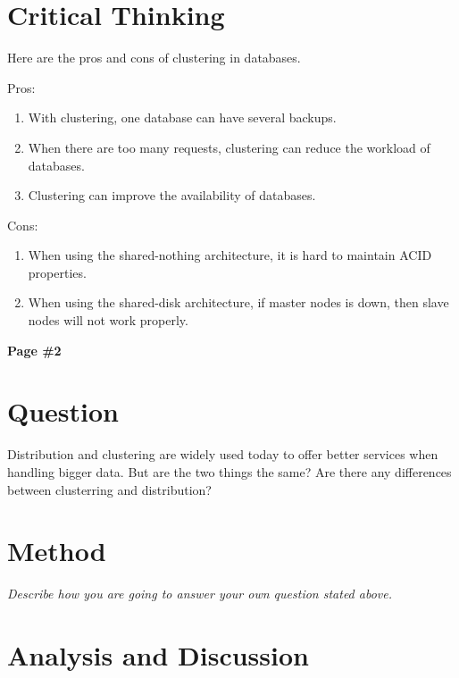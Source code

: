 \documentclass[12pt, a4paper]{article}
\begin{document}
\section{Critical Thinking}

Here are the pros and cons of clustering in databases.\cite{caleb}

Pros:
\begin{enumerate}[1.]\setlength{\itemsep}{-0.1cm}\setlength{\topsep}{0pt}
\item With clustering, one database can have several backups.
\item When there are too many requests, clustering can reduce the workload of databases.
\item Clustering can improve the availability of databases.
\end{enumerate}

Cons:
\begin{enumerate}[1.]\setlength{\itemsep}{-0.1cm}\setlength{\topsep}{0pt}
\item When using the shared-nothing architecture, it is hard to maintain ACID properties.
\item When using the shared-disk architecture, if master nodes is down, then slave nodes will not work properly.
\end{enumerate}


\newpage

\begin{center}
{\textbf{
Page \#2}}
\end{center}

\section{Question}

Distribution and clustering are widely used today to offer better services when handling bigger data. But are the two things the same? Are there any differences between clusterring and distribution?

\section{Method}

{\emph{Describe how you are going to answer your own question stated above.}}

\section{Analysis and Discussion}
\end{document}

